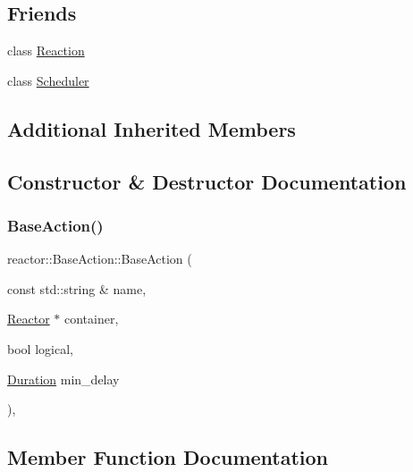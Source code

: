 \subsection*{Friends}
\begin{DoxyCompactItemize}
\item 
class \hyperlink{classreactor_1_1BaseAction_a5f86463029cca47f8aa15ff8cd5b9e51}{Reaction}
\item 
class \hyperlink{classreactor_1_1BaseAction_afb88c77ea5daaefa6c8fa6bc5b9aa5c1}{Scheduler}
\end{DoxyCompactItemize}
\subsection*{Additional Inherited Members}


\subsection{Constructor \& Destructor Documentation}
\mbox{\label{classreactor_1_1BaseAction_a94dadf5eacb10e4e1d7bc99e53ac8599}} 
\subsubsection{\texorpdfstring{Base\+Action()}{BaseAction()}}
{\footnotesize\ttfamily reactor\+::\+Base\+Action\+::\+Base\+Action (\begin{DoxyParamCaption}\item[{const std\+::string \&}]{name,  }\item[{\hyperlink{classreactor_1_1Reactor}{Reactor} $\ast$}]{container,  }\item[{bool}]{logical,  }\item[{\hyperlink{namespacereactor_aa8375b807a80703545664096c5b5b779}{Duration}}]{min\+\_\+delay }\end{DoxyParamCaption})\hspace{0.3cm}{\ttfamily [inline]}, {\ttfamily [protected]}}



\subsection{Member Function Documentation}
\mbox{\label{classreactor_1_1BaseAction_a7e4ad7157e653054c7afa22b78e46923}} 
